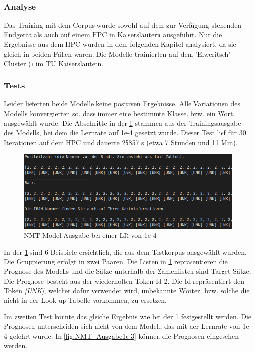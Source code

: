 \subsubsection{Analyse}
Das Training mit dem Corpus wurde sowohl auf dem zur Verfügung stehenden Endgerät als auch auf einem HPC in Kaiserslautern ausgeführt. Nur die Ergebnisse aus dem HPC wurden in dem folgenden Kapitel analysiert, da sie gleich in beiden Fällen waren. Die Modelle trainierten auf dem 'Elweritsch'-Cluster (\cite{AHRP:2022}) im TU Kaiserslautern. 

\subsubsection{Tests}
Leider lieferten beide Modelle keine positiven Ergebnisse. Alle Variationen des Modells konvergierten so, dass immer eine bestimmte Klasse, bzw. ein Wort, ausgewählt wurde. Die Abschnitte in der \cref{fig:NMT_Ausgabe} stammen aus der Trainingsausgabe des Modells, bei dem die Lernrate auf 1e-4 gesetzt wurde. Dieser Test lief für 30 Iterationen auf dem HPC und dauerte 25857 s (etwa 7 Stunden und 11 Min).

\begin{figure}
	\centering
	\includegraphics[scale=0.7]{images/NMT_lr1e-4_Ausgabe.png}
	\caption{NMT-Model Ausgabe bei einer LR von 1e-4}
	\label{fig:NMT_Ausgabe}
\end{figure}

In der \cref{fig:NMT_Ausgabe} sind 6 Beispiele ersichtlich, die aus dem Testkorpus ausgewählt wurden. Die Gruppierung erfolgt in zwei Paaren. Die Listen in \cref{fig:NMT_Ausgabe} repräsentieren die Prognose des Modells und die Sätze unterhalb der Zahlenlisten sind Target-Sätze. Die Prognose besteht aus der wiederholten Token-Id 2. Die Id repräsentiert den Token \textit{[UNK]}, welcher dafür verwendet wird, unbekannte Wörter, bzw. solche die nicht in der Look-up-Tabelle vorkommen, zu ersetzen. 


Im zweiten Test konnte das gleiche Ergebnis wie bei der \cref{fig:NMT_Ausgabe} festgestellt werden. Die Prognosen unterscheiden sich nicht von dem Modell, das mit der Lernrate von 1e-4 gelehrt wurde. In \cref{fig:NMT_Ausgabe1e-3} können die Prognosen eingesehen werden.

